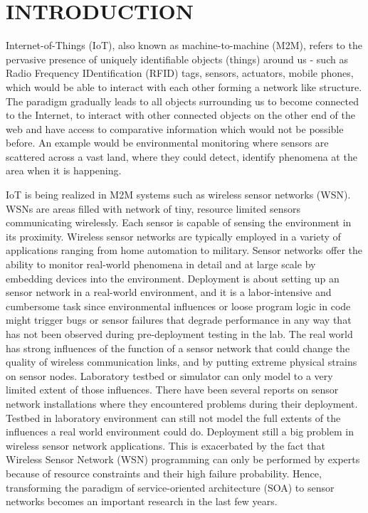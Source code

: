 \cleardoublepage
\singlespacing
\chapter{INTRODUCTION}
\label{c:intro}
\doublespacing\nointerlineskip

Internet-of-Things (IoT), also known as machine-to-machine (M2M), refers to the
pervasive presence of uniquely identifiable objects (things) around us - such as
Radio Frequency IDentification (RFID) tags, sensors,
actuators, mobile phones, which would be able to interact with each
other forming a network like structure. 
The paradigm gradually leads to all objects surrounding us to become connected
to the Internet, to interact with other connected objects on the other end of
the web and have access to comparative information which would not be possible
before.
An example would be environmental monitoring where sensors are scattered across
a vast land, where they could detect, identify phenomena at the area when it is
happening. 

IoT is being realized in M2M systems such as wireless sensor networks (WSN).
WSNs are areas filled with network of tiny, resource limited sensors
communicating wirelessly. Each sensor is capable of sensing the environment in
its proximity. Wireless sensor networks are typically employed in a variety of
applications ranging from home automation to military.
Sensor networks offer the ability to monitor real-world phenomena in detail and
at large scale by embedding devices into the environment. Deployment is
about setting up an sensor network in a real-world environment, and it is
a labor-intensive and cumbersome task since environmental influences or
loose program logic in code might trigger bugs or sensor failures that
degrade performance in any way that has not been observed during pre-deployment
testing in the lab.
The real world has strong influences of the function of a sensor network that
could change the quality of wireless communication links, and by putting
extreme physical strains on sensor nodes. Laboratory testbed or simulator can 
only model to a very limited extent of those influences.
There have been several reports on sensor network installations where they
encountered problems during their
deployment\cite{Barrenetxea2008,Polastre2004,Arora2004,Tateson2005,Padhy2005,Stoianov2007,Tolle2005,Werner-Allen2006a}.
Testbed in laboratory environment can still not model the full extents of the
influences a real world environment could do. Deployment still a big problem in
wireless sensor network applications.
This is exacerbated by the fact that Wireless Sensor Network (WSN) programming
can only be performed by experts because of resource constraints and their high
failure probability. Hence, transforming the paradigm of service-oriented
architecture (SOA) to sensor networks becomes an important research in the last
few years.~\cite{Koutsoukos2007,Hughes2012}

